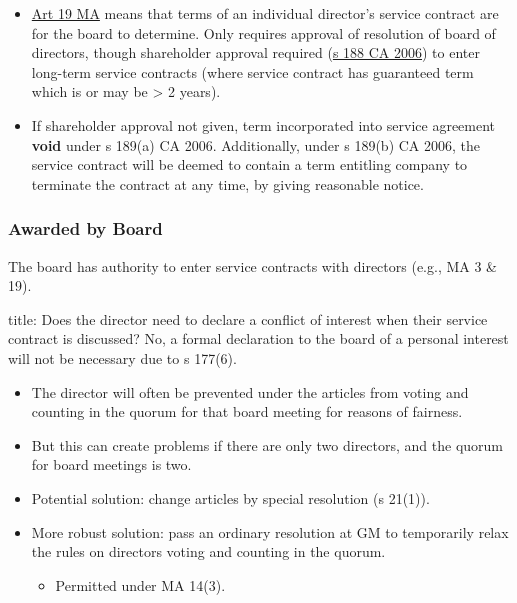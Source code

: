 \documentclass[
]{article}
\newenvironment{Shaded}{}{}
\newcommand{\NormalTok}[1]{#1}
\providecommand{\tightlist}{%
  \setlength{\itemsep}{0pt}\setlength{\parskip}{0pt}}
\begin{document}
\begin{itemize}
\tightlist
\item
  \href{https://www.gov.uk/government/publications/model-articles-for-private-companies-limited-by-shares/model-articles-for-private-companies-limited-by-shares\#remuneration}{Art
  19 MA} means that terms of an individual director's service contract
  are for the board to determine. Only requires approval of resolution
  of board of directors, though shareholder approval required
  (\href{https://www.legislation.gov.uk/ukpga/2006/46/section/188}{s 188
  CA 2006}) to enter long-term service contracts (where service contract
  has guaranteed term which is or may be \textgreater{} 2 years).
\item
  If shareholder approval not given, term incorporated into service
  agreement \textbf{void} under s 189(a) CA 2006. Additionally, under s
  189(b) CA 2006, the service contract will be deemed to contain a term
  entitling company to terminate the contract at any time, by giving
  reasonable notice.
\end{itemize}

\hypertarget{awarded-by-board}{%
\subsubsection{Awarded by Board}\label{awarded-by-board}}

The board has authority to enter service contracts with directors (e.g.,
MA 3 \& 19).

\begin{Shaded}
\begin{Highlighting}[]
\NormalTok{title: Does the director need to declare a conflict of interest when their service contract is discussed?}
\NormalTok{No, a formal declaration to the board of a personal interest will not be necessary due to s 177(6).}
\end{Highlighting}
\end{Shaded}

\begin{itemize}
\tightlist
\item
  The director will often be prevented under the articles from voting
  and counting in the quorum for that board meeting for reasons of
  fairness.
\item
  But this can create problems if there are only two directors, and the
  quorum for board meetings is two.
\item
  Potential solution: change articles by special resolution (s 21(1)).
\item
  More robust solution: pass an ordinary resolution at GM to temporarily
  relax the rules on directors voting and counting in the quorum.

  \begin{itemize}
  \tightlist
  \item
    Permitted under MA 14(3).
  \end{itemize}
\end{itemize}
\end{document}
